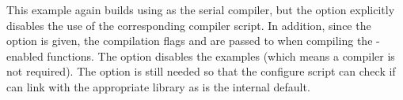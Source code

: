 \noindent This example again builds {\sundials} using  as the serial
{\C} compiler, but the  option explicitly disables the use
of the corresponding {\mpi} compiler script. In addition, since the 
 option is given, the compilation flags
 and  are passed
to  when compiling the {\mpi}-enabled functions. 
The  option disables the examples (which means
a {\F} compiler is not required).
The  option is still needed so that the configure
script can check if  can link with the appropriate {\mpi}
library as  is the internal default.
